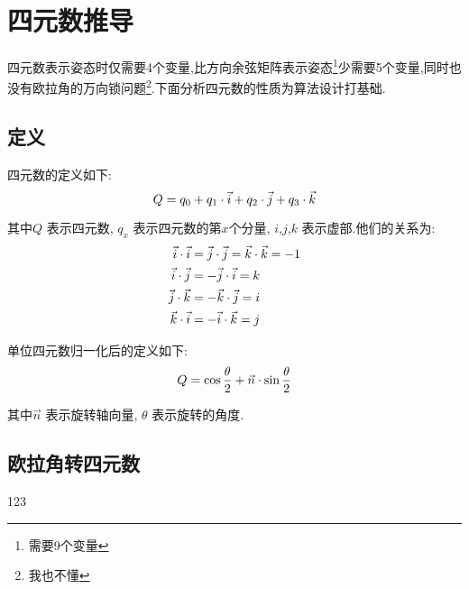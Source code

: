 
\section{四元数推导}
四元数表示姿态时仅需要4个变量,比方向余弦矩阵表示姿态\footnote{需要9个变量}少需要5个变量,同时也没有欧拉角的万向锁问题\footnote{我也不懂}.下面分析四元数的性质为算法设计打基础.

\subsection{定义}
四元数的定义如下:
\begin{equation}\label{四元数定义}
    Q = q_0 + q_1 \cdot \vec{i} + q_2 \cdot \vec{j} + q_3 \cdot \vec{k}
\end{equation} 

其中$Q$     表示四元数,
$q_x$       表示四元数的第$x$个分量,
$i$,$j$,$k$ 表示虚部.他们的关系为:
\begin{equation}\label{四元数虚部关系}
    \begin{split}
        \vec{i} \cdot \vec{i} &= \vec{j} \cdot \vec{j} = \vec{k} \cdot \vec{k} = -1 \\
        \vec{i} \cdot \vec{j} &= -\vec{j} \cdot \vec{i} = k \\
        \vec{j} \cdot \vec{k} &= -\vec{k} \cdot \vec{j} = i \\
        \vec{k} \cdot \vec{i} &= -\vec{i} \cdot \vec{k} = j
    \end{split}
\end{equation} 

单位四元数{归一化后}的定义如下:
\begin{equation}\label{单位四元数定义}
    Q = \cos\frac{\theta}{2} + \vec{n} \cdot \sin\frac{\theta}{2}
\end{equation} 

其中$\vec{n}$   表示旋转轴向量,
$\theta$        表示旋转的角度.

\subsection{欧拉角转四元数}
123

